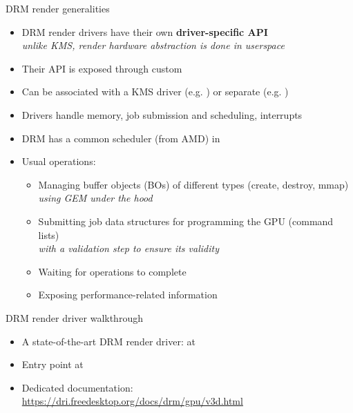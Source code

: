 \begin{frame}[fragile]{DRM render generalities}
  \begin{itemize}
  \item DRM render drivers have their own \textbf{driver-specific API}\\
    \textit{unlike KMS, render hardware abstraction is done in userspace}
  \item Their API is exposed through custom 
  \item Can be associated with a KMS driver (e.g. ) or separate (e.g. )
  \item Drivers handle memory, job submission and scheduling, interrupts
  \item DRM has a common scheduler (from AMD) in 
  \item Usual operations:
    \begin{itemize}
    \item Managing buffer objects (BOs) of different types (create, destroy, mmap)\\
    \textit{using GEM under the hood}
    \item Submitting job data structures for programming the GPU (command lists)\\
    \textit{with a validation step to ensure its validity}
    \item Waiting for operations to complete
    \item Exposing performance-related information
    \end{itemize}
  \end{itemize}
\end{frame}

\begin{frame}[fragile]{DRM render driver walkthrough}
  \begin{itemize}
  \item A state-of-the-art DRM render driver:  at 
  \item Entry point at 
  \item Dedicated documentation: \url{https://dri.freedesktop.org/docs/drm/gpu/v3d.html}
  \end{itemize}
\end{frame}

